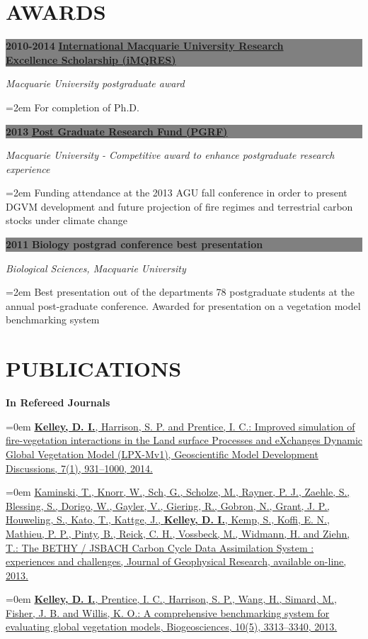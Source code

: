 \documentclass[paper=a4,fontsize=11pt]{scrartcl}	 			%
\newcommand{\sepspace}{\vspace*{0em}}			%
\newcommand{\NewPart}[1]{\vspace*{-0.5em} \section*{\uppercase{#1}} \vspace*{-0.75em} }
\newcommand{\EducationEntry}[4]{ \vspace*{0.7em}
		\noindent \colorbox{gray}{%
			\parbox{46em}{%
			\color{Black}\textbf{#2} \hspace{0.5cm} \textbf{#1}}} 				%
		\vspace*{-1em}
		\hfill 	\par				%
		\noindent \textit{#3} \par					%
		\noindent\hangindent=2em\hangafter=0 \small #4 	%
		\normalsize \par}
\newcommand{\BibEntry}[2]{
		\vspace*{-1em} \noindent \textbf{#1} \hfill \par					%
		\hangindent=0em\hangafter=0 \small #2} 	%
\begin{document}
  
\NewPart{Awards}
\EducationEntry{\href{http://www.hdr.mq.edu.au/information_about/scholarships}{International Macquarie University Research \\ Excellence Scholarship (iMQRES)}}{2010-2014} {\newline Macquarie University postgraduate award}{For completion of Ph.D.}
\sepspace

\EducationEntry{\href{http://www.hdr.mq.edu.au/information_for/current_candidates/financial_support}{Post Graduate Research Fund (PGRF)}}{2013} {Macquarie University - Competitive award to enhance postgraduate research experience}{Funding attendance at the 2013 AGU fall conference in order to present DGVM development and future projection of fire regimes and terrestrial carbon stocks under climate change}
\sepspace

\EducationEntry{Biology postgrad conference best presentation}{2011} {Biological Sciences, Macquarie University}{Best presentation out of the departments 78 postgraduate students at the annual post-graduate conference. Awarded for presentation on a vegetation model benchmarking system}
  

\NewPart{Publications}

\BibEntry{\newline In Refereed Journals}{\href{http://www.geosci-model-dev-discuss.net/7/931/2014/gmdd-7-931-2014.html}{\textbf{Kelley, D. I.}, Harrison, S. P. and Prentice, I. C.: Improved simulation of fire-vegetation interactions in the Land surface Processes and eXchanges Dynamic Global Vegetation Model (LPX-Mv1), Geoscientific Model Development Discussions, 7(1), 931--1000, 2014.}}


\BibEntry{} {\href{http://onlinelibrary.wiley.com/doi/10.1002/jgrg.20118/abstract}{Kaminski, T., Knorr, W., Sch, G., Scholze, M., Rayner, P. J., Zaehle, S., Blessing, S., Dorigo, W., Gayler, V., Giering, R., Gobron, N., Grant, J. P., Houweling, S., Kato, T., Kattge, J., \textbf{Kelley, D. I.}, Kemp, S., Koffi, E. N., Mathieu, P. P., Pinty, B., Reick, C. H., Vossbeck, M., Widmann, H. and Ziehn, T.: The BETHY / JSBACH Carbon Cycle Data Assimilation System : experiences and challenges, Journal of Geophysical Research, available on-line, 2013.}}


\BibEntry{} {\href{http://www.biogeosciences.net/10/3313/2013/bg-10-3313-2013.html}{\textbf{Kelley, D. I.}, Prentice, I. C., Harrison, S. P., Wang, H., Simard, M., Fisher, J. B. and Willis, K. O.: A comprehensive benchmarking system for evaluating global vegetation models, Biogeosciences, 10(5), 3313--3340, 2013.}}
\end{document}
